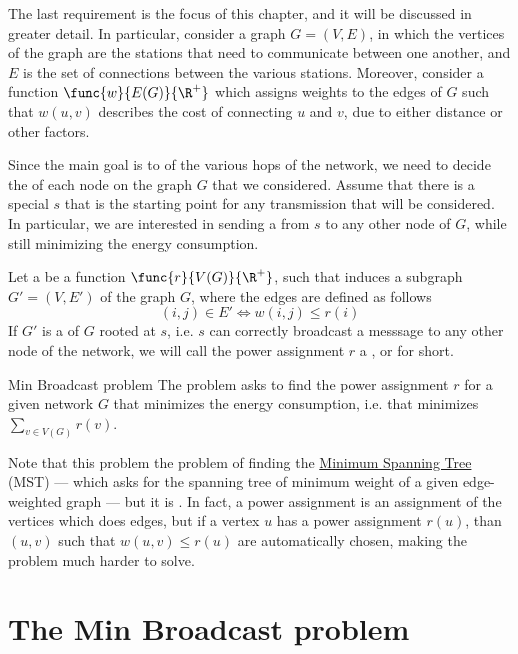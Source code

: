 \documentclass[a4paper, 12pt]{report}
\begin{document}
    The last requirement is the focus of this chapter, and it will be discussed in greater detail. In particular, consider a graph $G = (V, E)$, in which the vertices of the graph are the stations that need to communicate between one another, and $E$ is the set of connections between the various stations. Moreover, consider a function $\func{w}{E(G)}{\R^+}$ which assigns weights to the edges of $G$ such that $w(u, v)$ describes the cost of connecting $u$ and $v$, due to either distance or other factors.

    Since the main goal is to  of the various hops of the network, we need to decide the  of each node on the graph $G$ that we considered. Assume that there is a special  $s$ that is the starting point for any transmission that will be considered. In particular, we are interested in sending a  from $s$ to any other node of $G$, while still minimizing the energy consumption.

    Let a  be a function $\func{r}{V(G)}{\R^+}$, such that induces a subgraph $G'= (V, E')$ of the graph $G$, where the edges are defined as follows $$(i, j) \in E' \iff w(i, j) \le r(i)$$ If $G'$ is a  of $G$ rooted at $s$, i.e. $s$ can correctly broadcast a messsage to any other node of the network, we will call the power assignment $r$ a , or  for short.

    \begin{frameddefn}{Min Broadcast problem}
        The  problem asks to find the power assignment $r$ for a given network $G$ that minimizes the energy consumption, i.e. that minimizes $\sum_{v \in V(G)}{r(v)}$.
    \end{frameddefn}

    Note that this problem  the problem of finding the \href{https://en.wikipedia.org/wiki/Minimum_spanning_tree}{Minimum Spanning Tree} (MST) --- which asks for the spanning tree of minimum weight of a given edge-weighted graph --- but it is . In fact, a power assignment is an assignment of the vertices which does  edges, but if a vertex $u$ has a power assignment $r(u)$, than  $(u, v)$ such that $w(u, v) \le r(u)$ are automatically chosen, making the problem much harder to solve.

    \section{The Min Broadcast problem}
\end{document}

